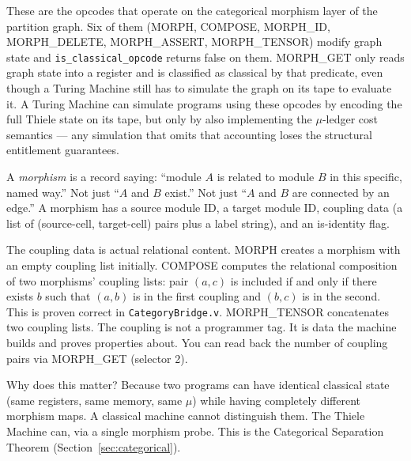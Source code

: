 \documentclass[11pt,a4paper]{article}
\theoremstyle{plain}
\theoremstyle{definition}
\theoremstyle{remark}
\begin{document}
These are the opcodes that operate on the categorical morphism layer of the partition graph. Six of them (MORPH, COMPOSE, MORPH\_ID, MORPH\_DELETE, MORPH\_ASSERT, MORPH\_TENSOR) modify graph state and \texttt{is\_classical\_opcode} returns false on them. MORPH\_GET only reads graph state into a register and is classified as classical by that predicate, even though a Turing Machine still has to simulate the graph on its tape to evaluate it. A Turing Machine can simulate programs using these opcodes by encoding the full Thiele state on its tape, but only by also implementing the $\mu$-ledger cost semantics --- any simulation that omits that accounting loses the structural entitlement guarantees.

A \emph{morphism} is a record saying: ``module $A$ is related to module $B$ in this specific, named way.'' Not just ``$A$ and $B$ exist.'' Not just ``$A$ and $B$ are connected by an edge.'' A morphism has a source module ID, a target module ID, coupling data (a list of (source-cell, target-cell) pairs plus a label string), and an is-identity flag.

The coupling data is actual relational content. MORPH creates a morphism with an empty coupling list initially. COMPOSE computes the relational composition of two morphisms' coupling lists: pair $(a, c)$ is included if and only if there exists $b$ such that $(a, b)$ is in the first coupling and $(b, c)$ is in the second. This is proven correct in \texttt{CategoryBridge.v}. MORPH\_TENSOR concatenates two coupling lists. The coupling is not a programmer tag. It is data the machine builds and proves properties about. You can read back the number of coupling pairs via MORPH\_GET (selector 2).

Why does this matter? Because two programs can have identical classical state (same registers, same memory, same $\mu$) while having completely different morphism maps. A classical machine cannot distinguish them. The Thiele Machine can, via a single morphism probe. This is the Categorical Separation Theorem (Section~\ref{sec:categorical}).
\end{document}
